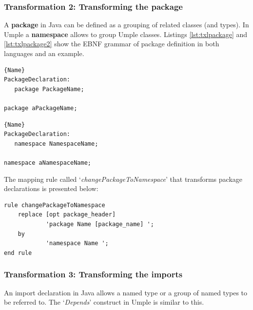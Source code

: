 \subsubsection{Transformation 2: Transforming the package} 

A \textbf{package} in Java can be defined as a grouping of related classes (and types). In Umple a \textbf{namespace} allows to group Umple classes. Listings \ref{lst:txlpackage} and \ref{lst:txlpackage2} show the EBNF grammar of package definition in both languages and an example. 

\noindent\begin{minipage}{.45\textwidth}
\begin{lstlisting}[style=umplePlain,caption=Java Package,label=lst:txlpackage]{Name}
PackageDeclaration:
   package PackageName; 

package aPackageName;
\end{lstlisting}
\end{minipage}\hfill
\begin{minipage}{.45\textwidth}
\begin{lstlisting}[style=umplePlain,caption=Umple Namespace,label=lst:txlpackage2]{Name}
PackageDeclaration:
   namespace NamespaceName;
 
namespace aNamespaceName;
\end{lstlisting}
\end{minipage}


The mapping rule called `\textit{changePackageToNamespace}' that transforms package declarations is presented below:

\begin{lstlisting}[style=umplePlain, label=lst:packageDeclRule3, caption=TXL mapping rule for the transformation of the package declaration]
rule changePackageToNamespace 
    replace [opt package_header]      
            'package Name [package_name] '; 
    by       
            'namespace Name '; 
end rule	
\end{lstlisting}

\subsubsection{Transformation 3: Transforming the imports} 

An import declaration in Java allows a named type or a group of named types to be referred to. The `\textit{Depends}' construct in Umple is similar to this. 

